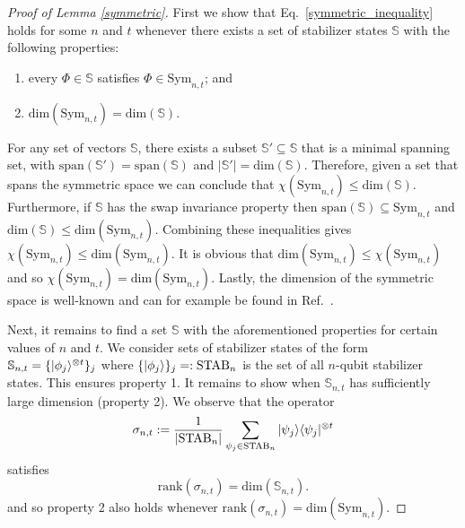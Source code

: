 \begin{proof}[Proof of Lemma \ref{symmetric}]  First we show that Eq.~\eqref{symmetric_inequality} holds for some $n$ and $t$ whenever there exists a set of stabilizer states $\mathbb{S}$ with the following properties:
	\begin{enumerate}
		 \item every $\Phi \in \mathbb{S}$ satisfies $\Phi \in \mathrm{Sym}_{n,t}$; and
\item $\mathrm{dim}(\mathrm{Sym}_{n,t}) = \mathrm{dim}( \mathbb{S} )$.
	\end{enumerate}	
 For any set of vectors $\mathbb{S}$, there exists a subset $\mathbb{S}' \subseteq \mathbb{S}$  that is a minimal spanning set, with $\mathrm{span}(\mathbb{S}')=\mathrm{span}(\mathbb{S})$ and $|\mathbb{S}'|=\mathrm{dim}(\mathbb{S})$.  Therefore, given a set that spans the symmetric space we can conclude that $\chi(\mathrm{Sym}_{n,t}  ) \leq \mathrm{dim}(\mathbb{S})$.  Furthermore, if $\mathbb{S}$ has the swap invariance property then $\mathrm{span}(\mathbb{S}) \subseteq \mathrm{Sym}_{n,t} $ and $\mathrm{dim}(\mathbb{S}) \leq \mathrm{dim}(\mathrm{Sym}_{n,t})$.   Combining these inequalities gives $\chi(\mathrm{Sym}_{n,t}  ) \leq\mathrm{dim}(\mathrm{Sym}_{n,t})$.  It is obvious that $\mathrm{dim}(\mathrm{Sym}_{n,t}) \leq \chi(\mathrm{Sym}_{n,t}  )$ and so $\chi(\mathrm{Sym}_{n,t}  ) = \mathrm{dim}(\mathrm{Sym}_{n,t})$.  Lastly, the dimension of the symmetric space is well-known and can for example be found in Ref.~\cite{zhu16}. 

Next, it remains to find a set $\mathbb{S}$ with the aforementioned properties for certain values of $n$ and $t$.  We consider sets of stabilizer states of the form $\mathbb{S}_{n,t}=\{ \vert\phi_j\rangle^{\otimes t} \}_j$ where $\{ \vert\phi_j\rangle \}_j =: \mathrm{STAB}_n$ is the set of all $n$-qubit stabilizer states.  This ensures property 1.  It remains to show when $\mathbb{S}_{n,t}$ has sufficiently large dimension (property 2).  We observe that the operator
\begin{equation}
	 \sigma_{n,t} :=\frac{1}{|\mathrm{STAB}_n|} \sum_{\psi_j \in \mathrm{STAB}_n} \vert \psi_j \rangle \langle \psi_j \vert^{\otimes t}
\end{equation}	
satisfies
\begin{equation}
	 \mathrm{rank}( \sigma_{n,t} ) = \mathrm{dim}( \mathbb{S}_{n,t}  ) .
\end{equation}
and so property 2 also holds whenever $\mathrm{rank}( \sigma_{n,t} )=\mathrm{dim}( \mathrm{Sym}_{n,t}  )$. 


\end{proof}
